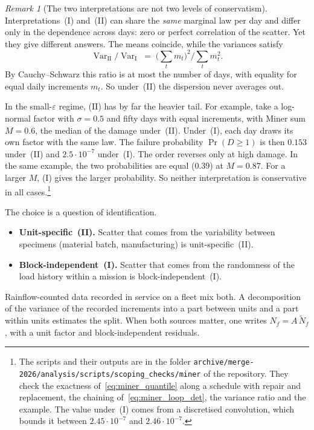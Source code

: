 \documentclass[11pt,a4paper]{article}
\theoremstyle{plain}
\theoremstyle{definition}
\theoremstyle{remark}
\newtheorem{remark}[theorem]{Remark}
\begin{document}
\begin{remark}[The two interpretations are not two levels of conservatism]\label{rem:miner_dichotomy}
Interpretations~(I) and~(II) can share the \emph{same} marginal law per day and differ only in the dependence across days: zero or perfect correlation of the scatter.
Yet they give different answers.
The means coincide, while the variances satisfy
\begin{equation}
  \operatorname{Var}_{\mathrm{II}}/\operatorname{Var}_{\mathrm{I}} \;=\; \Big(\sum_t m_t\Big)^2 \Big/ \sum_t m_t^2.
\end{equation}
By Cauchy--Schwarz this ratio is at most the number of days, with equality for equal daily increments $m_t$.
So under~(II) the dispersion never averages out.

In the small-$\varepsilon$ regime, (II) has by far the heavier tail.
For example, take a log-normal factor with $\sigma = 0.5$ and fifty days with equal increments, with Miner sum $M = 0.6$, the median of the damage under~(II).
Under~(I), each day draws its own factor with the same law.
The failure probability $\Pr(D \ge 1)$ is then $0.153$ under~(II) and $2.5 \cdot 10^{-7}$ under~(I).
The order reverses only at high damage.
In the same example, the two probabilities are equal ($0.39$) at $M = 0.87$.
For a larger $M$, (I) gives the larger probability.
So neither interpretation is conservative in all cases.\footnote{The scripts and their outputs are in the folder \texttt{archive/merge-2026/analysis/scripts/\allowbreak scoping\_checks/miner} of the repository. They check the exactness of~\eqref{eq:miner_quantile} along a schedule with repair and replacement, the chaining of~\eqref{eq:miner_loop_det}, the variance ratio and the example. The value under~(I) comes from a discretised convolution, which bounds it between $2.45 \cdot 10^{-7}$ and $2.46 \cdot 10^{-7}$.}

The choice is a question of identification.
\begin{itemize}
  \item \textbf{Unit-specific~(II).} Scatter that comes from the variability between specimens (material batch, manufacturing) is unit-specific~(II).
  \item \textbf{Block-independent~(I).} Scatter that comes from the randomness of the load history within a mission is block-independent~(I).
\end{itemize}
Rainflow-counted data recorded in service on a fleet mix both.
A decomposition of the variance of the recorded increments into a part between units and a part within units estimates the split.
When both sources matter, one writes $N_f = A\,\widetilde N_f$, with a unit factor and block-independent residuals.


\end{remark}
\end{document}
